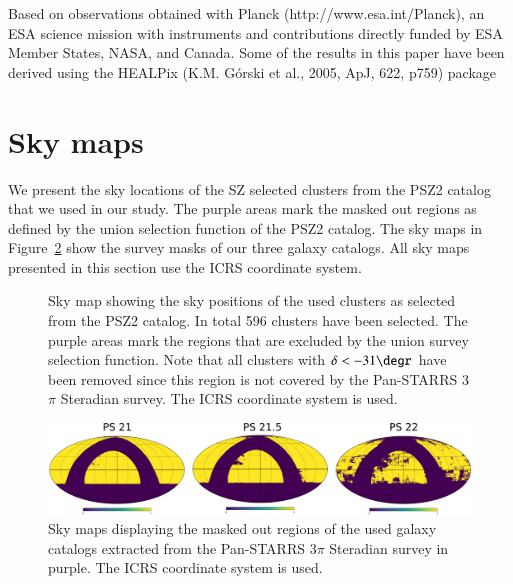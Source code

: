 \documentclass[iop, apjl, twocolappendix, numberedappendix]{emulateapj}
\begin{document}
Based on observations obtained with Planck
(http://www.esa.int/Planck), an ESA science mission with instruments
and contributions directly funded by ESA Member States, NASA, and
Canada.  Some of the results in this paper have been derived using
the HEALPix (K.M. Górski et al., 2005, ApJ, 622, p759) package


 

\appendix


\section{Sky maps}
\label{sec:figures}
We present the sky locations of the SZ selected clusters from the PSZ2
catalog that we used in our study. The purple areas mark the masked
out regions as defined by the union selection function of the PSZ2
catalog. The sky maps in Figure~\ref{fig:heal_map} show the survey
masks of our three galaxy catalogs.  All sky maps presented in this
section use the ICRS coordinate system.

\begin{figure}
\caption{Sky map showing the sky positions of the used clusters as
selected from the PSZ2 catalog. In total 596 clusters have been
selected. The purple areas mark the regions that are excluded by the
union survey selection function. Note that all clusters with
$\delta<-31\degr$ have been removed since this region is not covered
by the Pan-STARRS 3$\pi$ Steradian survey. The ICRS coordinate
system is used.}
    \label{fig:planck_fig} 
\end{figure}

\begin{figure}
    \includegraphics[width= \textwidth]{heal_maps.png}
\caption{Sky maps displaying the masked out regions of the used
galaxy catalogs extracted from the Pan-STARRS 3$\pi$ Steradian
survey in purple. The ICRS coordinate system is used.}
   \label{fig:heal_map} 
\end{figure}
\end{document}
